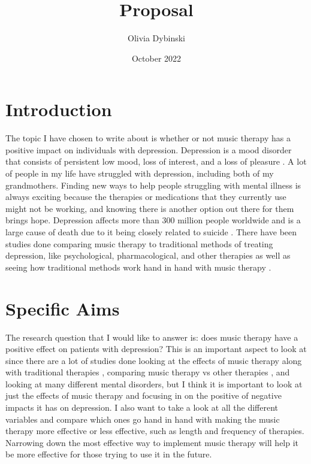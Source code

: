 \documentclass[12pt]{article}
\title{Proposal}
\author{Olivia Dybinski\\}
\date{October 2022}
\begin{document}
 \maketitle


 \section{Introduction} 
 \label{sec:intro}

 The topic I have chosen to write about is whether or not music therapy has a positive impact on individuals with depression. Depression is a mood disorder that consists of persistent low mood, loss of interest, and a loss of pleasure \citet{Cochrane}. A lot of people in my life have struggled with depression, including both of my grandmothers. Finding new ways to help people struggling with mental illness is always exciting because the therapies or medications that they currently use might not be working, and knowing there is another option out there for them brings hope. Depression affects more than 300 million people worldwide and is a large cause of death due to it being closely related to suicide \citet{PLOS}. There have been studies done comparing music therapy to traditional methods of treating depression, like psychological, pharmacological, and other therapies \citet{Cochrane} as well as seeing how traditional methods work hand in hand with music therapy \citet{British}.

 \section{Specific Aims}
 \label{sec:aims}

 The research question that I would like to answer is: does music therapy have a positive effect on patients with depression? This is an important aspect to look at since there are a lot of studies done looking at the effects of music therapy along with traditional therapies \citet{British}, comparing music therapy vs other therapies \citet{Cochrane}, and looking at many different mental disorders, but I think it is important to look at just the effects of music therapy and focusing in on the positive of negative impacts it has on depression. I also want to take a look at all the different variables and compare which ones go hand in hand with making the music therapy more effective or less effective, such as length and frequency of therapies. Narrowing down the most effective way to implement music therapy will help it be more effective for those trying to use it in the future.
\end{document}
